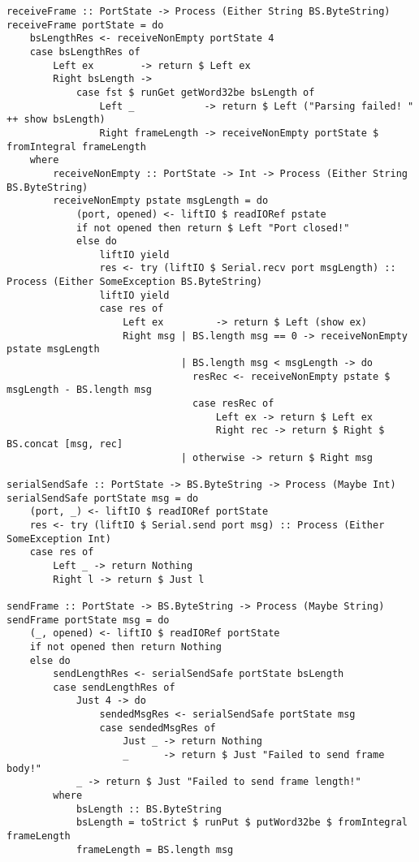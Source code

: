 \documentclass[russian,utf8,simple,emptystyle]{eskdtext}
\begin{document}
\begin{lstlisting}
receiveFrame :: PortState -> Process (Either String BS.ByteString)
receiveFrame portState = do 
    bsLengthRes <- receiveNonEmpty portState 4
    case bsLengthRes of 
        Left ex        -> return $ Left ex
        Right bsLength -> 
            case fst $ runGet getWord32be bsLength of
                Left _            -> return $ Left ("Parsing failed! " ++ show bsLength)
                Right frameLength -> receiveNonEmpty portState $ fromIntegral frameLength
    where
        receiveNonEmpty :: PortState -> Int -> Process (Either String BS.ByteString)
        receiveNonEmpty pstate msgLength = do
            (port, opened) <- liftIO $ readIORef pstate
            if not opened then return $ Left "Port closed!"
            else do
                liftIO yield
                res <- try (liftIO $ Serial.recv port msgLength) :: Process (Either SomeException BS.ByteString)
                liftIO yield
                case res of 
                    Left ex         -> return $ Left (show ex)
                    Right msg | BS.length msg == 0 -> receiveNonEmpty pstate msgLength
                              | BS.length msg < msgLength -> do 
                                resRec <- receiveNonEmpty pstate $ msgLength - BS.length msg
                                case resRec of
                                    Left ex -> return $ Left ex
                                    Right rec -> return $ Right $ BS.concat [msg, rec]
                              | otherwise -> return $ Right msg 

serialSendSafe :: PortState -> BS.ByteString -> Process (Maybe Int)
serialSendSafe portState msg = do 
    (port, _) <- liftIO $ readIORef portState
    res <- try (liftIO $ Serial.send port msg) :: Process (Either SomeException Int)
    case res of 
        Left _ -> return Nothing
        Right l -> return $ Just l 

sendFrame :: PortState -> BS.ByteString -> Process (Maybe String)
sendFrame portState msg = do
    (_, opened) <- liftIO $ readIORef portState
    if not opened then return Nothing
    else do
        sendLengthRes <- serialSendSafe portState bsLength
        case sendLengthRes of 
            Just 4 -> do 
                sendedMsgRes <- serialSendSafe portState msg 
                case sendedMsgRes of
                    Just _ -> return Nothing
                    _      -> return $ Just "Failed to send frame body!"
            _ -> return $ Just "Failed to send frame length!"
        where
            bsLength :: BS.ByteString
            bsLength = toStrict $ runPut $ putWord32be $ fromIntegral frameLength
            frameLength = BS.length msg
\end{lstlisting}
\end{document}

